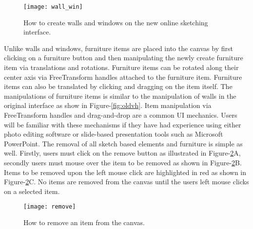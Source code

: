 		\begin{figure}[h]
		\centering
		\texttt{[image: wall\_win]}
		\caption{How to create walls and windows on the new online sketching interface.}
		\label{fig:wall_win}
		\end{figure}

		Unlike walls and windows, furniture items are placed into the canvas by first clicking on a furniture button and then manipulating the newly create furniture item via translations and rotations. 
		Furniture items can be rotated along their center axis via FreeTransform handles attached to the furniture item.
		Furniture items can also be translated by clicking and dragging on the item itself.
		The manipulations of furniture items is similar to the manipulation of walls in the original interface as show in Figure-\ref{fig:oldvh}.
		Item manipulation via FreeTransform handles and drag-and-drop are a common UI mechanics. 
		Users will be familiar with these mechanisms if they have had experience using either photo editing software or slide-based presentation tools such as Microsoft PowerPoint\cite{}.
		The removal of all sketch based elements and furniture is simple as well.
		Firstly, users must click on the remove button as illustrated in Figure-\ref{fig:remove}A, secondly users must mouse over the item to be removed as shown in Figure-\ref{fig:remove}B.
		Items to be removed upon the left mouse click are highlighted in red as shown in Figure-\ref{fig:remove}C.
		No items are removed from the canvas until the users left mouse clicks on a selected item.
		
		\begin{figure}[h]
		\centering
		\texttt{[image: remove]}
		\caption{How to remove an item from the canvas. 
		}
		\label{fig:remove}
		\end{figure}

